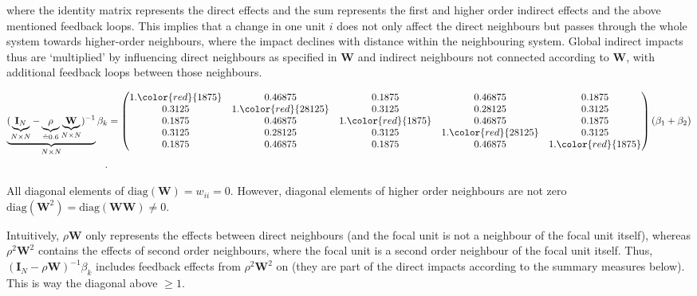 \documentclass[
  letterpaper,
  DIV=11,
  numbers=noendperiod]{scrreprt}
\begin{document}
where the identity matrix represents the direct effects and the sum
represents the first and higher order indirect effects and the above
mentioned feedback loops. This implies that a change in one unit \(i\)
does not only affect the direct neighbours but passes through the whole
system towards higher-order neighbours, where the impact declines with
distance within the neighbouring system. Global indirect impacts thus
are `multiplied' by influencing direct neighbours as specified in
\(\boldsymbol{\mathbf{W}}\) and indirect neighbours not connected
according to \(\boldsymbol{\mathbf{W}}\), with additional feedback loops
between those neighbours.

\[
\begin{split}
\underbrace{(\underbrace{\boldsymbol{\mathbf{I}}_N}_{N \times N} - \underbrace{\rho}_{\hat{=} 0.6} \underbrace{\boldsymbol{\mathbf{W}}}_{N \times N})^{-1}}_{N \times N} \beta_k
&=
\begin{pmatrix}
      1.\color{red}{1875} & 0.46875 & 0.1875 & 0.46875 & 0.1875 \\
      0.3125 & 1.\color{red}{28125} & 0.3125 & 0.28125 & 0.3125 \\
      0.1875 & 0.46875 & 1.\color{red}{1875} & 0.46875 & 0.1875 \\
      0.3125 & 0.28125 & 0.3125 & 1.\color{red}{28125} & 0.3125 \\
      0.1875 & 0.46875 & 0.1875 & 0.46875 & 1.\color{red}{1875}
      \end{pmatrix}
  \begin{matrix}
      (\beta_1 + \beta_2)\\
  \end{matrix}\\.
\end{split}
\]

All diagonal elements of
\(\mathrm{diag}({\boldsymbol{\mathbf{W}}})=w_{ii}=0\). However, diagonal
elements of higher order neighbours are not zero
\(\mathrm{diag}({\boldsymbol{\mathbf{W}}}^2)=\mathrm{diag}({\boldsymbol{\mathbf{W}}}{\boldsymbol{\mathbf{W}}})\neq0\).

Intuitively, \(\rho{\boldsymbol{\mathbf{W}}}\) only represents the
effects between direct neighbours (and the focal unit is not a neighbour
of the focal unit itself), whereas \(\rho^2{\boldsymbol{\mathbf{W}}}^2\)
contains the effects of second order neighbours, where the focal unit is
a second order neighbour of the focal unit itself. Thus,
\(({\boldsymbol{\mathbf{I}}_N}-\rho {\boldsymbol{\mathbf{W}}})^{-1}\beta_k\)
includes {feedback effects} from \(\rho^2{\boldsymbol{\mathbf{W}}}^2\)
on (they are part of the direct impacts according to the summary
measures below). This is way the {diagonal above} \(\geq 1\).
\end{document}
